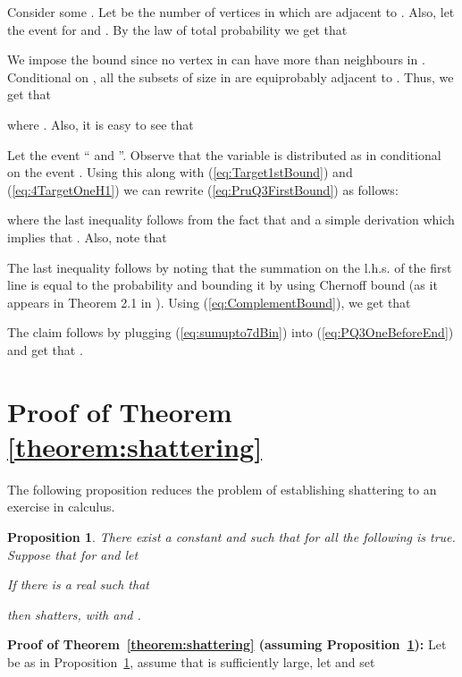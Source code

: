 \documentclass[a4paper,10pt]{article}
\makeatletter
\newtheorem{proposition}{Proposition}\renewcommand{\theproposition}{\arabic{proposition}}
\newenvironment{claimproof}[1]{\noindent{\bf Proof of Claim #1\@:}}{\hfill \\}
\newcommand\Prop{Proposition}
\newcommand\Thm{Theorem}
\makeatother
\begin{document}
\begin{claimproof}{\ref{Lemma:Q3}}
Consider some .
Let  be the number of vertices in  which are adjacent to . Also, let 
the event  for 
and .
By the law of total probability we get that

We impose the bound   since no vertex in 
can have more than  neighbours in .
Conditional on ,  all the
subsets of size  in  are equiprobably adjacent to .
Thus, we get that

where . Also, it is easy to see that 



\noindent
Let the event `` and ''.
Observe that the variable   is distributed as in 
conditional on the event . Using this  along with 
(\ref{eq:Target1stBound}) and (\ref{eq:4TargetOneH1})
we can rewrite (\ref{eq:PruQ3FirstBound}) as follows:

where the last inequality follows from the fact that 
and a simple derivation which implies that 
.
Also, note that

The last inequality follows by noting that the summation on the l.h.s. of the first line
is equal to the probability  and  bounding it by using
Chernoff bound  (as it appears in Theorem 2.1 in \cite{janson}).
Using (\ref{eq:ComplementBound}), we get that

The claim follows by plugging (\ref{eq:sumupto7dBin}) into (\ref{eq:PQ3OneBeforeEnd}) and
get that .
\end{claimproof}








\section{Proof of Theorem \ref{theorem:shattering}}\label{sec:theorem:shattering}


The following proposition reduces the problem of establishing shattering to an exercise in calculus.

\begin{proposition}\label{Prop_calcShattering}
There exist a constant  and  such that for all
 the following is true. Suppose that   for
 and let
	
If there is a real  such that
	
then  shatters, with  and .
\end{proposition}

\noindent
{\bf Proof of \Thm~\ref{theorem:shattering} (assuming \Prop~\ref{Prop_calcShattering}):}
Let  be as in \Prop~\ref{Prop_calcShattering}, assume that  is sufficiently large,
let  and set
	
\end{document}
